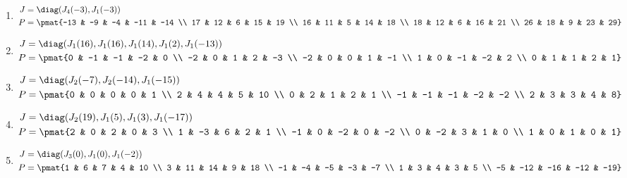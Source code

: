 \begin{enumerate}
\item

\begin{align*}
J &= \diag(J_{4}(-3), J_{1}(-3))\\
P &= \pmat{-13 & -9 & -4 & -11 & -14 \\ 17 & 12 & 6 & 15 & 19 \\ 16 & 11 & 5 & 14 & 18 \\ 18 & 12 & 6 & 16 & 21 \\ 26 & 18 & 9 & 23 & 29}
\end{align*}

\item

\begin{align*}
J &= \diag(J_{1}(16), J_{1}(16), J_{1}(14), J_{1}(2), J_{1}(-13))\\
P &= \pmat{0 & -1 & -1 & -2 & 0 \\ -2 & 0 & 1 & 2 & -3 \\ -2 & 0 & 0 & 1 & -1 \\ 1 & 0 & -1 & -2 & 2 \\ 0 & 1 & 1 & 2 & 1}
\end{align*}

\item

\begin{align*}
J &= \diag(J_{2}(-7), J_{2}(-14), J_{1}(-15))\\
P &= \pmat{0 & 0 & 0 & 0 & 1 \\ 2 & 4 & 4 & 5 & 10 \\ 0 & 2 & 1 & 2 & 1 \\ -1 & -1 & -1 & -2 & -2 \\ 2 & 3 & 3 & 4 & 8}
\end{align*}

\item

\begin{align*}
J &= \diag(J_{2}(19), J_{1}(5), J_{1}(3), J_{1}(-17))\\
P &= \pmat{2 & 0 & 2 & 0 & 3 \\ 1 & -3 & 6 & 2 & 1 \\ -1 & 0 & -2 & 0 & -2 \\ 0 & -2 & 3 & 1 & 0 \\ 1 & 0 & 1 & 0 & 1}
\end{align*}

\item

\begin{align*}
J &= \diag(J_{3}(0), J_{1}(0), J_{1}(-2))\\
P &= \pmat{1 & 6 & 7 & 4 & 10 \\ 3 & 11 & 14 & 9 & 18 \\ -1 & -4 & -5 & -3 & -7 \\ 1 & 3 & 4 & 3 & 5 \\ -5 & -12 & -16 & -12 & -19}
\end{align*}


\end{enumerate}
